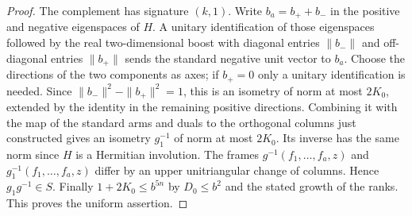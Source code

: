 \documentclass[a4paper,11pt]{article}
\theoremstyle{definition}
\theoremstyle{remark}
\numberwithin{equation}{section}
\begin{document}
\begin{proof}
The complement has signature \((k,1)\). Write \(b_a=b_++b_-\)
in the positive and negative eigenspaces of \(H\). A unitary
identification of those eigenspaces followed by the real
two-dimensional boost with diagonal entries \(\|b_-\|\) and
off-diagonal entries \(\|b_+\|\) sends the standard negative
unit vector to \(b_a\). Choose the directions of the two
components as axes; if \(b_+=0\) only a unitary identification
is needed. Since \(\|b_-\|^2-\|b_+\|^2=1\), this is an isometry
of norm at most \(2K_0\), extended by the identity in the
remaining positive directions. Combining it with the map of
the standard arms and duals to the orthogonal columns just
constructed gives an isometry \(g_1^{-1}\) of norm at most
\(2K_0\). Its inverse has the same norm since \(H\) is a
Hermitian involution. The frames \(g^{-1}(f_1,\ldots,f_a,z)\)
and \(g_1^{-1}(f_1,\ldots,f_a,z)\) differ by an upper
unitriangular change of columns. Hence \(g_1g^{-1}\in S\).
Finally \(1+2K_0\le b^{5n}\) by \(D_0\le b^2\) and the stated
growth of the ranks. This proves the uniform assertion.
\end{proof}
\end{document}
